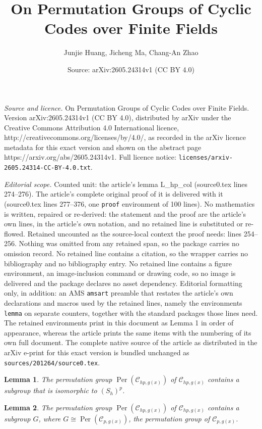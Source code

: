 \documentclass[10pt,a4paper]{amsart}
\title{On Permutation Groups of Cyclic Codes over Finite Fields}
\author{Junjie Huang, Jicheng Ma, Chang-An Zhao}
\date{Source: arXiv:2605.24314v1 (CC BY 4.0)}
\newtheorem{lemma}{Lemma}
\begin{document}
\maketitle

\noindent\emph{Source and licence.} On Permutation Groups of Cyclic Codes over Finite Fields. Version arXiv:2605.24314v1 (CC BY 4.0), distributed by arXiv under the Creative Commons Attribution 4.0 International licence, http://creativecommons.org/licenses/by/4.0/, as recorded in the arXiv licence metadata for this exact version and shown on the abstract page https://arxiv.org/abs/2605.24314v1. Full licence notice: \texttt{licenses/arxiv-2605.24314-CC-BY-4.0.txt}.\par\smallskip

\noindent\textit{Editorial scope.} Counted unit: the article's lemma L\_hp\_col (source0.tex lines 274--276). The article's complete original proof of it is delivered with it (source0.tex lines 277--376, one \texttt{proof} environment of 100 lines). No mathematics is written, repaired or re-derived: the statement and the proof are the article's own lines, in the article's own notation, and no retained line is substituted or re-flowed.  Retained uncounted as the source-local context the proof needs: lines 254--256.  Nothing was omitted from any retained span, so the package carries no omission record.  No retained line contains a citation, so the wrapper carries no bibliography and no bibliography entry.  No retained line contains a figure environment, an image-inclusion command or drawing code, so no image is delivered and the package declares no asset dependency.  Editorial formatting only, in addition: an AMS \texttt{amsart} preamble that restates the article's own declarations and macros used by the retained lines, namely the environments \texttt{lemma} on separate counters, together with the standard packages those lines need.  The retained environments print in this document as Lemma 1 in order of appearance, whereas the article prints the same items with the numbering of its own full document.  The complete native source of the article as distributed in the arXiv e-print for this exact version is bundled unchanged as \texttt{sources/201264/source0.tex}.
\begin{lemma}\label{L_hp_row}
    The permutation group $\operatorname{Per}(\mathcal{C}_{hp,g(x)})$ of $\mathcal{C}_{hp,g(x)}$ contains a subgroup that is isomorphic to $(S_h)^p$. 
\end{lemma}

\begin{lemma}\label{L_hp_col}
    The permutation group $\operatorname{Per}(\mathcal{C}_{hp,g(x)})$ of $\mathcal{C}_{hp,g(x)}$ contains a subgroup $G$, where $G\cong \operatorname{Per}(\mathcal{C}_{p,g(x)})$, the permutation group of $\mathcal{C}_{p,g(x)}$. 
\end{lemma}
\end{document}
